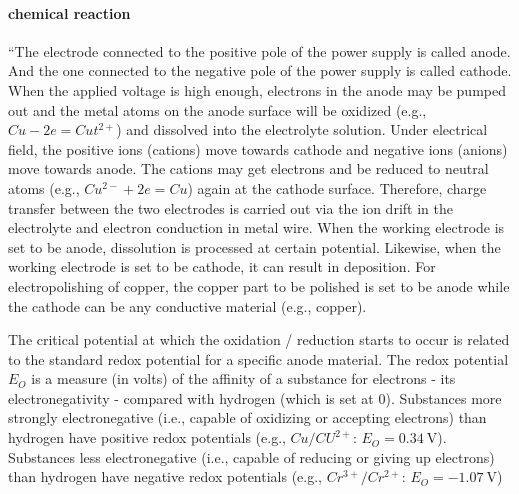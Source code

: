\paragraph{chemical reaction}
``The electrode connected to the positive pole of the power supply is called anode. And the one connected to the negative pole of the power supply is called cathode. When the applied voltage is high enough, electrons in the anode may be pumped out and the metal atoms on the anode surface will be oxidized (e.g., $Cu - 2e = Cut^{2+}$) and dissolved into the electrolyte solution. Under electrical field, the positive ions (cations) move towards cathode and negative ions (anions) move towards anode. The cations may get electrons and be reduced to neutral atoms (e.g., $Cu^{2-} + 2e = Cu$) again at the cathode surface. Therefore, charge transfer between the two electrodes is carried out via the ion drift in the electrolyte and electron conduction in metal wire. When the working electrode is set to be anode, dissolution is processed at certain potential. Likewise, when the working electrode is set to be cathode, it can result in deposition. For electropolishing of copper, the copper part to be polished is set to be anode while the cathode can be any conductive material (e.g., copper).

The critical potential at which the oxidation / reduction starts to occur is related to the standard redox potential for a specific anode material. The redox potential $E_O$ is a measure (in volts) of the affinity of a substance for electrons - its electronegativity - compared with hydrogen (which is set at 0). Substances more strongly electronegative (i.e., capable of oxidizing or accepting electrons) than hydrogen have positive redox potentials (e.g., $Cu/CU^{2+}$: $E_O = \SI{0.34}{\volt}$). Substances less electronegative (i.e., capable of reducing or giving up electrons) than hydrogen have negative redox potentials (e.g., $Cr^{3+}/Cr^{2+}$: $E_O = \SI{-1.07}{\volt}$)\cite{jinshan_electrochemical_2004}

